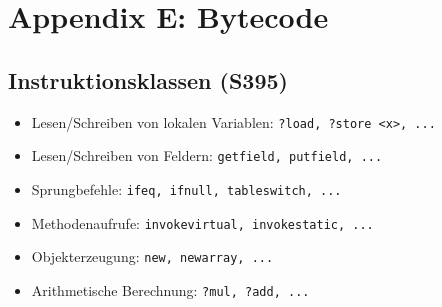 \section{Appendix E: Bytecode}

\subsection{Instruktionsklassen (S395)}
\begin{itemize}
	\item Lesen/Schreiben von lokalen Variablen: \texttt{?load, ?store <x>, ...}
	\item Lesen/Schreiben von Feldern: \texttt{getfield, putfield, ...}
	\item Sprungbefehle: \texttt{ifeq, ifnull, tableswitch, ...}
	\item Methodenaufrufe: \texttt{invokevirtual, invokestatic, ...}
	\item Objekterzeugung: \texttt{new, newarray, ...}
	\item Arithmetische Berechnung: \texttt{?mul, ?add, ...}
\end{itemize}